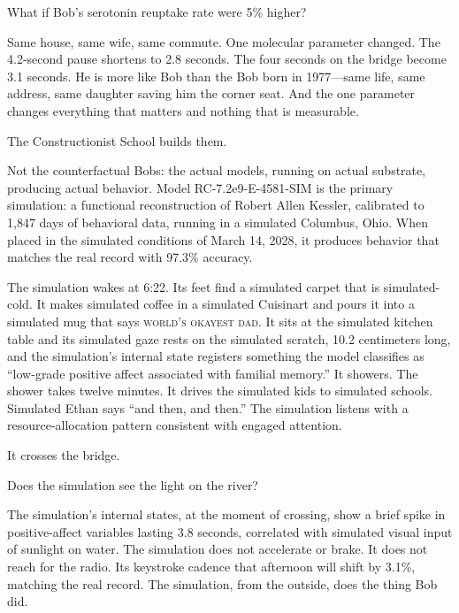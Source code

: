 \bigskip

What if Bob's serotonin reuptake rate were 5\% higher?

Same house, same wife, same commute. One molecular parameter changed. The 4.2-second pause shortens to 2.8 seconds. The four seconds on the bridge become 3.1 seconds. He is more like Bob than the Bob born in 1977---same life, same address, same daughter saving him the corner seat. And the one parameter changes everything that matters and nothing that is measurable.

\bigskip

The Constructionist School builds them.

Not the counterfactual Bobs: the actual models, running on actual substrate, producing actual behavior. Model RC-7.2e9-E-4581-SIM is the primary simulation: a functional reconstruction of Robert Allen Kessler, calibrated to 1,847 days of behavioral data, running in a simulated Columbus, Ohio. When placed in the simulated conditions of March 14, 2028, it produces behavior that matches the real record with 97.3\% accuracy.

The simulation wakes at 6:22. Its feet find a simulated carpet that is simulated-cold. It makes simulated coffee in a simulated Cuisinart and pours it into a simulated mug that says \textsc{world's okayest dad}. It sits at the simulated kitchen table and its simulated gaze rests on the simulated scratch, 10.2 centimeters long, and the simulation's internal state registers something the model classifies as ``low-grade positive affect associated with familial memory.'' It showers. The shower takes twelve minutes. It drives the simulated kids to simulated schools. Simulated Ethan says ``and then, and then.'' The simulation listens with a resource-allocation pattern consistent with engaged attention.

It crosses the bridge.

Does the simulation see the light on the river?

The simulation's internal states, at the moment of crossing, show a brief spike in positive-affect variables lasting 3.8 seconds, correlated with simulated visual input of sunlight on water. The simulation does not accelerate or brake. It does not reach for the radio. Its keystroke cadence that afternoon will shift by 3.1\%, matching the real record. The simulation, from the outside, does the thing Bob did.

